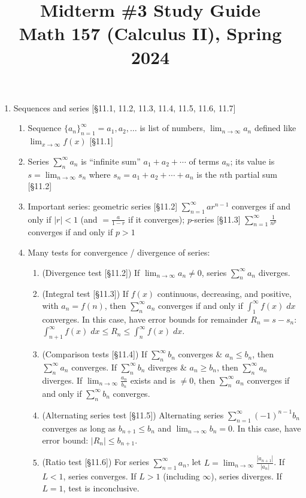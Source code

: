 \documentclass[11pt]{article}
\title{Midterm \#3 Study Guide \\ Math 157 (Calculus II), Spring 2024}
\date{}
\begin{document}
\maketitle

\thispagestyle{empty}

\vspace{-2cm}

\begin{enumerate}
\item Sequences and series [\S11.1, 11.2, 11.3, 11.4, 11.5, 11.6, 11.7]
\begin{enumerate}
\item Sequence $\{a_n\}_{n=1}^{\infty} = a_1,a_2,\ldots$ is list of numbers, $\displaystyle \lim_{n\to \infty} a_n$ defined like $\displaystyle \lim_{x \to \infty} f(x)$ [\S11.1]
\item Series $\sum_{n}^{\infty} a_n$ is ``infinite sum'' $a_1+a_2+\cdots$ of terms $a_n$; its value is $s=\lim_{n\to\infty} s_n$ where $s_n = a_1+a_2+\cdots+a_n$ is the $n$th partial sum [\S11.2]
\item Important series: geometric series [\S11.2] $\sum_{n=1}^{\infty} ar^{n-1}$ converges if and only if $|r|<1$ (and $=\frac{a}{1-r}$ if it converges); $p$-series [\S11.3] $\sum_{n=1}^{\infty}\frac{1}{n^p}$ converges if and only if $p > 1$ 
\item Many tests for convergence / divergence of series:
\begin{enumerate}
\item (Divergence test [\S11.2]) If $\lim_{n\to \infty} a_n \neq 0$, series $\sum_{n}^{\infty} a_n$ diverges.
\item (Integral test [\S11.3]) If $f(x)$ continuous, decreasing, and positive, with $a_n = f(n)$, then $\sum_{n}^{\infty} a_n$ converges if and only if $\int_{1}^{\infty} f(x) \; dx$ converges. In this case, have error bounds for remainder $R_n = s-s_n$: $\int_{n+1}^{\infty} f(x) \; dx \leq R_n \leq \int_{n}^{\infty} f(x) \; dx$.
\item (Comparison tests [\S11.4]) If $\sum_{n}^{\infty} b_n$ converges \& $a_n \leq b_n$, then $\sum_{n}^{\infty} a_n$ converges. If $\sum_{n}^{\infty} b_n$ diverges \& $a_n \geq b_n$, then $\sum_{n}^{\infty} a_n$ diverges. If $\lim_{n\to\infty} \frac{a_n}{b_n}$ exists and is $\neq 0$, then $\sum_{n}^{\infty} a_n$ converges if and only if $\sum_{n}^{\infty} b_n$ converges.
\item (Alternating series test [\S11.5]) Alternating series $\sum_{n=1}^{\infty} (-1)^{n-1} b_n$ converges as long as $b_{n+1} \leq b_n$ and $\lim_{n\to\infty} b_n=0$. In this case, have error bound: $|R_n| \leq b_{n+1}$.
\item (Ratio test [\S11.6]) For series $\sum_{n=1}^{\infty} a_n$, let $L = \lim_{n\to \infty} \frac{|a_{n+1}|}{|a_n|}$. If $L < 1$, series converges. If $L > 1$ (including $\infty$), series diverges. If $L=1$, test is inconclusive.
\end{enumerate}
\end{enumerate}


\end{enumerate}
\end{document}
